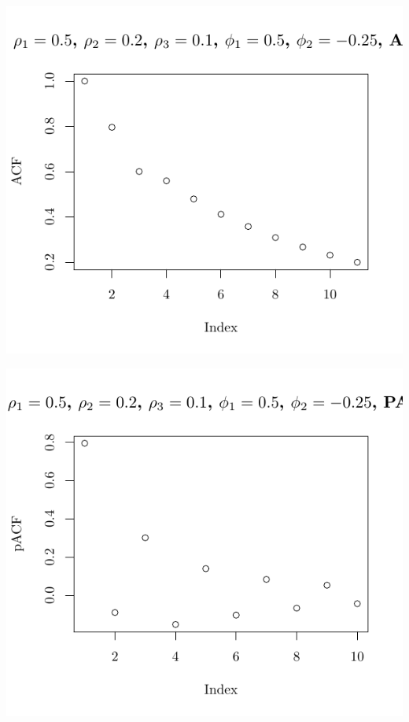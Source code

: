 \documentclass[10pt]{paper}\usepackage[]{graphicx}\usepackage[]{color}
\makeatletter
\def\maxwidth{ %
  \ifdim\Gin@nat@width>\linewidth
    \linewidth
  \else
    \Gin@nat@width
  \fi
}
\newenvironment{knitrout}{}{} %
\makeatother
\begin{document}
\begin{knitrout}
{\centering \includegraphics[width=\maxwidth]{figure/graphics-plotter-205} 

}




{\centering \includegraphics[width=\maxwidth]{figure/graphics-plotter-206} 

}





\end{knitrout}
\end{document}

